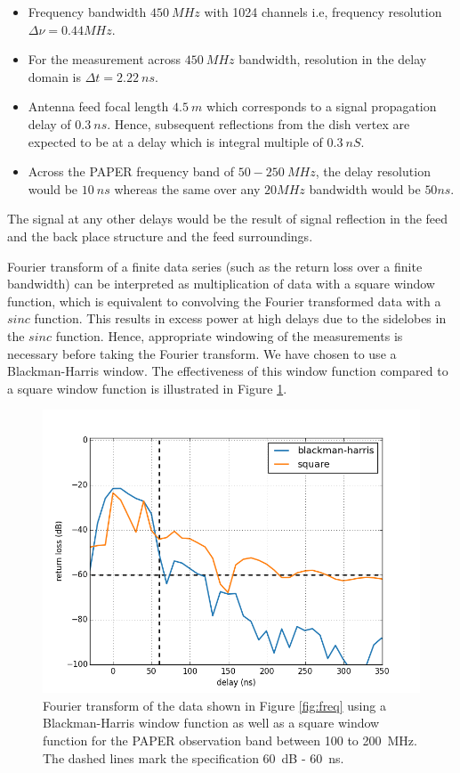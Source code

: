 \documentclass[12pt,preprint]{aastex}
\begin{document}
\begin{itemize}
\item
Frequency bandwidth $450~MHz$ with 1024 channels i.e, frequency resolution $\Delta \nu = 0.44MHz$.
\item
For the measurement across $450~MHz$ bandwidth, resolution in the delay domain is $\Delta t = 2.22~ns$.
\item
Antenna feed focal length $4.5~m$ which corresponds to a signal propagation delay of $0.3~ns$. Hence, subsequent reflections from the dish vertex are expected to be at a delay which is integral multiple of $0.3~nS$. 
\item
Across the PAPER frequency band of $50 - 250~MHz$, the delay resolution would be $10~ns$ whereas the same over any $20MHz$ bandwidth would be $50ns$.
\end{itemize} 

The signal at any other delays would be the result of signal reflection in the feed and the back place structure and the feed surroundings. 
 
Fourier transform of a finite data series (such as the return loss over a finite bandwidth) can be interpreted as multiplication of data with a square window function, which is equivalent to convolving the Fourier transformed data with a $sinc$ function. This results in excess power at high delays due to the sidelobes in the $sinc$ function. Hence, appropriate windowing of the measurements is necessary before taking the Fourier transform. We have chosen to use a Blackman-Harris window. The effectiveness of this window function compared to a square window function is illustrated in Figure \ref{fig:window}.

\begin{figure}[H]
\centering
\includegraphics[totalheight=0.4\textheight]{plots/bh_vs_sq.png}
\caption{Fourier transform of the data shown in Figure \ref{fig:freq} using a Blackman-Harris window function as well as a square window function for the PAPER observation band between 100 to 200~MHz. The dashed lines mark the specification 60~dB - 60~ns.   }
\label{fig:window}
\end{figure}
\end{document}
